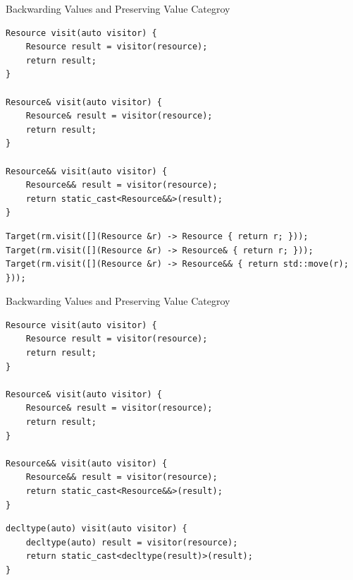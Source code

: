 \documentclass[compress,aspectratio=1610]{beamer}
\newcommand{\inputcpplisting}[1]{}
\begin{document}
\begin{frame}[fragile]{Backwarding Values and Preserving Value Categroy}
    \centering

    \begin{lstlisting}
Resource visit(auto visitor) {
    Resource result = visitor(resource);
    return result;
}

Resource& visit(auto visitor) {
    Resource& result = visitor(resource);
    return result;
}

Resource&& visit(auto visitor) {
    Resource&& result = visitor(resource);
    return static_cast<Resource&&>(result);
}
    \end{lstlisting}

    \begin{lstlisting}
Target(rm.visit([](Resource &r) -> Resource { return r; }));
Target(rm.visit([](Resource &r) -> Resource& { return r; }));
Target(rm.visit([](Resource &r) -> Resource&& { return std::move(r); }));
    \end{lstlisting}
\end{frame}

\begin{frame}[fragile]{Backwarding Values and Preserving Value Categroy}
    \centering

    \begin{lstlisting}
Resource visit(auto visitor) {
    Resource result = visitor(resource);
    return result;
}

Resource& visit(auto visitor) {
    Resource& result = visitor(resource);
    return result;
}

Resource&& visit(auto visitor) {
    Resource&& result = visitor(resource);
    return static_cast<Resource&&>(result);
}
    \end{lstlisting}

    \begin{lstlisting}
decltype(auto) visit(auto visitor) {
    decltype(auto) result = visitor(resource);
    return static_cast<decltype(result)>(result);
}
    \end{lstlisting}
\end{frame}

\begin{frame}
    \centering

    \inputcpplisting{snippet15}
\end{frame}
\end{document}
